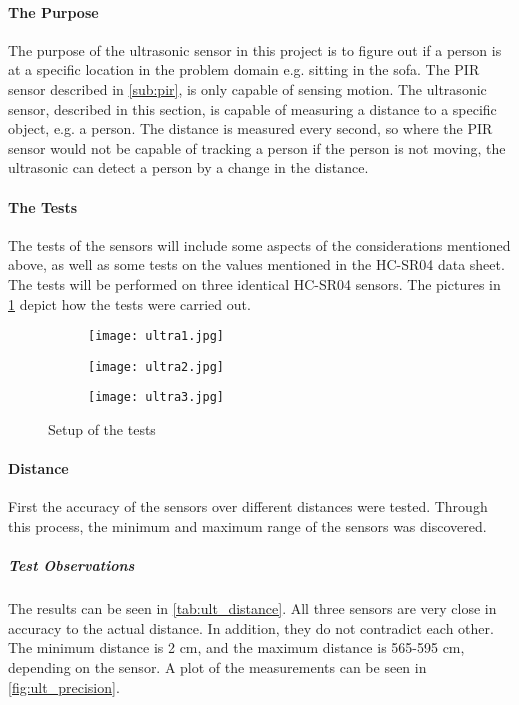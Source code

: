 \paragraph{The Purpose}
The purpose of the ultrasonic sensor in this project is to figure out if a person is at a specific location in the problem domain e.g. sitting in the sofa. The PIR sensor described in \cref{sub:pir}, is only capable of sensing motion. The ultrasonic sensor, described in this section, is capable of measuring a distance to a specific object, e.g. a person. The distance is measured every second, so where the PIR sensor would not be capable of tracking a person if the person is not moving, the ultrasonic can detect a person by a change in the distance.

\paragraph{The Tests} The tests of the sensors will include some aspects of the considerations mentioned above, as well as some tests on the values mentioned in the HC-SR04 data sheet\cite{hcsr04}. The tests will be performed on three identical HC-SR04 sensors. The pictures in \cref{fig:ultra} depict how the tests were carried out.

\begin{figure}[htbp]
  \centering
  \begin{subfigure}{.3\textwidth}
    \centering
    \texttt{[image: ultra1.jpg]}
  \end{subfigure}
  \begin{subfigure}{.3\textwidth}
    \centering
    \texttt{[image: ultra2.jpg]}
  \end{subfigure}
  \begin{subfigure}{.3\textwidth}
    \centering
    \texttt{[image: ultra3.jpg]}
  \end{subfigure}
  \caption{Setup of the tests}\label{fig:ultra}
\end{figure}

\paragraph{Distance}
First the accuracy of the sensors over different distances were tested. Through this process, the minimum and maximum range of the sensors was discovered.

\subparagraph{Test Observations}
The results can be seen in \cref{tab:ult_distance}. All three sensors are very close in accuracy to the actual distance. In addition, they do not contradict each other. The minimum distance is 2 cm, and the maximum distance is 565-595 cm, depending on the sensor. A plot of the measurements can be seen in \cref{fig:ult_precision}.

